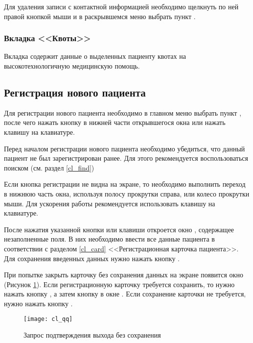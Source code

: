 Для удаления записи с контактной информацией необходимо щелкнуть по ней правой кнопкой мыши и в раскрывшемся меню выбрать пункт .

\subsubsection{Вкладка <<Квоты>>}

Вкладка содержит данные о выделенных пациенту квотах на высокотехнологичную медицинскую помощь. 

\subsection{Регистрация нового пациента} \label{cl_new}

Для регистрации нового пациента необходимо в главном меню выбрать пункт , после чего нажать кнопку   в нижней части открывшегося окна или нажать клавишу  на клавиатуре.

\begin{vnim}
Перед началом регистрации нового пациента необходимо убедиться, что данный пациент не был зарегистрирован ранее. Для этого рекомендуется воспользоваться поиском (см. раздел \ref{cl_find})
\end{vnim}

\begin{vnim}
Если кнопка регистрации не видна на экране, то необходимо выполнить переход в нижнюю часть окна, используя полосу прокрутки справа, или колесо прокрутки мыши. Для ускорения работы рекомендуется использовать клавишу  на клавиатуре.
\end{vnim}
 
После нажатия указанной кнопки или клавиши откроется окно , содержащее незаполненные поля. В них необходимо ввести все данные пациента в соответствии с разделом \ref{cl_card} <<Регистрационная карточка пациента>>. Для сохранения введенных данных нужно нажать кнопку .

При попытке закрыть карточку без сохранения данных на экране появится окно (Рисунок \ref{img_cl_qq}). Если регистрационную карточку требуется сохранить, то нужно нажать кнопку  , а затем кнопку   в окне . Если сохранение карточки не требуется, нужно нажать кнопку .

\begin{figure}[ht]\centering
 \texttt{[image: cl\_qq]}
 \caption{Запрос подтверждения выхода без сохранения}
 \label{img_cl_qq}
\end{figure} 

